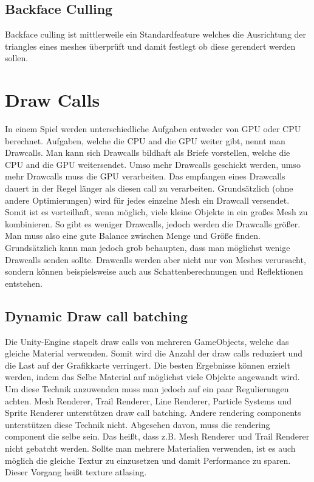 \subsection{Backface Culling}
Backface culling ist mittlerweile ein Standardfeature welches die Ausrichtung der triangles eines meshes überprüft und damit festlegt ob diese gerendert werden sollen.
\cite{_cryengine_culling}

\section{Draw Calls}
In einem Spiel werden unterschiedliche Aufgaben entweder von GPU oder CPU berechnet.
Aufgaben, welche die CPU and die GPU weiter gibt, nennt man Drawcalls. Man kann sich Drawcalls bildhaft als Briefe vorstellen, welche die CPU and die GPU weitersendet. Umso mehr Drawcalls geschickt werden, umso mehr Drawcalls muss die GPU verarbeiten. Das empfangen eines Drawcalls dauert in der Regel länger als diesen call zu verarbeiten. Grundsätzlich (ohne andere Optimierungen) wird für jedes einzelne Mesh ein Drawcall versendet. Somit ist es vorteilhaft, wenn möglich, viele kleine Objekte in ein großes Mesh zu kombinieren. So gibt es weniger Drawcalls, jedoch werden die Drawcalls größer. Man muss also eine gute Balance zwischen Menge und Größe finden. Grundsätzlich kann man jedoch grob behaupten, dass man möglichst wenige Drawcalls senden sollte. Drawcalls werden aber nicht nur von Meshes verursacht, sondern können beispielsweise auch aus Schattenberechnungen und Reflektionen entstehen.

\subsection{Dynamic Draw call batching}
Die Unity-Engine stapelt draw calls von mehreren GameObjects, welche das gleiche Material verwenden. Somit wird die Anzahl der draw calls reduziert und die Last auf der Grafikkarte verringert. Die besten Ergebnisse können erzielt werden, indem das Selbe Material auf möglichst viele Objekte angewandt wird. Um diese Technik anzuwenden muss man jedoch auf ein paar Regulierungen achten. Mesh Renderer, Trail Renderer, Line Renderer, Particle Systems und Sprite Renderer unterstützen draw call batching. Andere rendering components unterstützen diese Technik nicht. Abgesehen davon, muss die rendering component die selbe sein. Das heißt, dass z.B. Mesh Renderer und Trail Renderer nicht gebatcht werden. Sollte man mehrere Materialien verwenden, ist es auch möglich die gleiche Textur zu einzusetzen und damit Performance zu sparen. Dieser Vorgang heißt texture atlasing.

